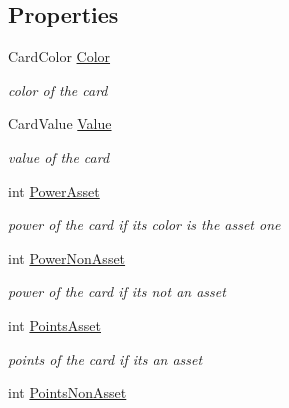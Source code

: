 \subsection*{Properties}
\begin{DoxyCompactItemize}
\item 
Card\+Color \hyperlink{class_coinche_1_1_card_aa16b6cca19c354b8243cae302c1ef7ef}{Color}
\begin{DoxyCompactList}\small\item\em color of the card \end{DoxyCompactList}\item 
Card\+Value \hyperlink{class_coinche_1_1_card_a78224b5558f9f9bbd4036be50f4da865}{Value}
\begin{DoxyCompactList}\small\item\em value of the card \end{DoxyCompactList}\item 
int \hyperlink{class_coinche_1_1_card_a554cc67985a48ffafe912e35f725c898}{Power\+Asset}
\begin{DoxyCompactList}\small\item\em power of the card if its color is the asset one \end{DoxyCompactList}\item 
int \hyperlink{class_coinche_1_1_card_a1bdf34d04e55d97bcf2163b811c78dd3}{Power\+Non\+Asset}
\begin{DoxyCompactList}\small\item\em power of the card if it\textquotesingle{}s not an asset \end{DoxyCompactList}\item 
int \hyperlink{class_coinche_1_1_card_ae6c4c19d3fb112f06eceb9b9b67ad9d6}{Points\+Asset}
\begin{DoxyCompactList}\small\item\em points of the card if it\textquotesingle{}s an asset \end{DoxyCompactList}\item 
int \hyperlink{class_coinche_1_1_card_a2f5e7d69b5492f3af0b738b2bb3013e4}{Points\+Non\+Asset}

\end{DoxyCompactItemize}

